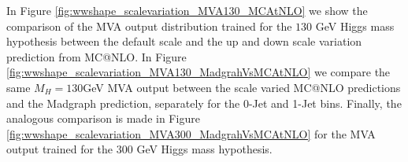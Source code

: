 \begin{figure}[!htbp]
\begin{center}
\caption{
}
\label{fig:wwshape_scalevariation_mass}
\end{center}
\end{figure}


In Figure \ref{fig:wwshape_scalevariation_MVA130_MCAtNLO} we show the comparison
of the MVA output distribution trained for the $130$ GeV Higgs mass hypothesis
between the default scale and the up and down scale variation prediction from 
MC@NLO. In Figure \ref{fig:wwshape_scalevariation_MVA130_MadgrahVsMCAtNLO} we
compare the same $M_{H} = 130$GeV MVA output between the scale varied 
MC@NLO predictions and the Madgraph prediction, separately for the 0-Jet
and 1-Jet bins. Finally, the analogous comparison is made in Figure 
\ref{fig:wwshape_scalevariation_MVA300_MadgrahVsMCAtNLO} for the MVA
output trained for the $300$ GeV Higgs mass hypothesis. 




